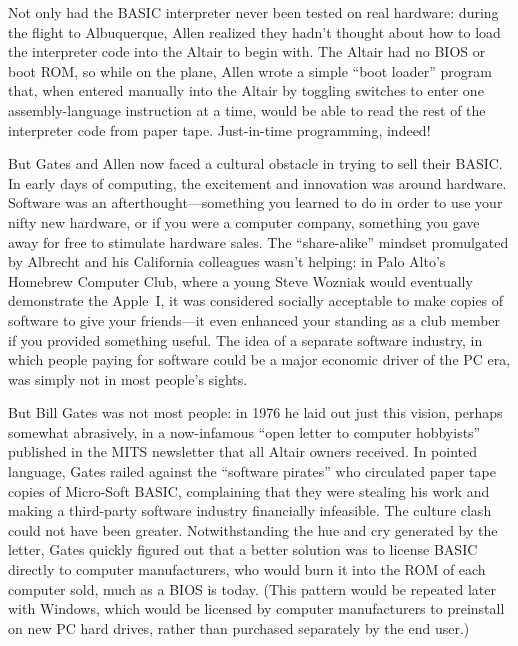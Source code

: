 \begin{tangent}
Not only had the BASIC interpreter never been tested on real hardware:
during the flight to Albuquerque, Allen realized they hadn't thought
about how to load the interpreter code into the Altair to begin with.
The Altair had no BIOS or boot ROM, so while on the plane, Allen wrote a
simple ``boot loader'' program that, when entered manually into the
Altair by toggling switches to enter one assembly-language instruction
at a time, would be able to read the rest of the interpreter code from
paper tape.  Just-in-time programming, indeed!
\end{tangent}

But Gates and Allen now faced a cultural obstacle in trying to sell their
BASIC.
In early days of computing, the excitement and innovation was around hardware.
Software was an afterthought---something you learned to do in order to
use your nifty new hardware, or if you were a computer company,
something you gave away for free to stimulate hardware sales.
The ``share-alike'' mindset promulgated by Albrecht and his California
colleagues wasn't helping:
in Palo Alto's Homebrew
Computer Club, where a young Steve Wozniak would
eventually demonstrate the Apple~I, it
was considered socially acceptable to
make copies of software  to give your friends---it even enhanced
your standing as a club member if you provided something useful.
The idea of a separate software industry, in which
people paying for software could be a major economic driver of the PC era,
was simply not in most people's sights.  

But Bill Gates was not most people: in 1976 he laid out just this vision,
perhaps somewhat abrasively, in a now-infamous ``open letter to computer
hobbyists'' published in the 
MITS newsletter that all Altair owners received.
In pointed language, Gates railed against the ``software pirates'' who
circulated paper tape copies of Micro-Soft BASIC, complaining that they
were stealing 
his work and making a third-party software industry financially
infeasible.
The culture clash could not have been greater.
Notwithstanding the hue and cry generated by the letter, Gates
quickly figured out that a better solution was to license BASIC directly
to computer manufacturers, who would burn it into the ROM of each
computer sold, much as a BIOS is today.
(This pattern would be repeated later with Windows, which would be
licensed by computer manufacturers to preinstall on new PC hard drives,
rather than purchased separately by the end user.)

